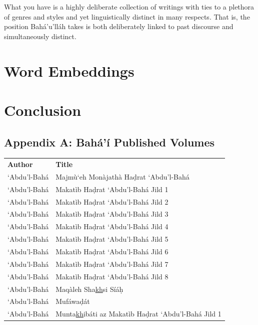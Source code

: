 \documentclass[12pt, oneside]{report}
\begin{document}
What you have is a highly deliberate collection of writings with ties to a plethora of genres and styles and yet linguistically distinct in many respects. That is, the position Bahá’u’lláh takes is both deliberately linked to past discourse and simultaneously	distinct.
		
	
\chapter{Word Embeddings}	
		
\chapter{Conclusion}
\newpage
\begin{appendix}
\chapter*{Appendix A: Bah\'{a}'\'{i} Published Volumes}
\label{app-1}
\begin{table}[ht]
	\setlength{\tabcolsep}{18pt}
	\begin{tabular}{ll}
	\textbf{Author} & \textbf{Title} \\
		`Abdu'l-Bah\'{a}	& Majm\`{u}`eh Mon\`{a}jath\`{a} Ha\d{d}rat `Abdu'l-Bah\'{a} \\
	`Abdu'l-Bah\'{a}	& Makat\`{i}b Ha\d{d}rat `Abdu'l-Bah\'{a} Jild 1 \\
	`Abdu'l-Bah\'{a}	& Makat\`{i}b Ha\d{d}rat `Abdu'l-Bah\'{a} Jild 2 \\
	`Abdu'l-Bah\'{a}	& Makat\`{i}b Ha\d{d}rat `Abdu'l-Bah\'{a} Jild 3 \\
	`Abdu'l-Bah\'{a}	& Makat\`{i}b Ha\d{d}rat `Abdu'l-Bah\'{a} Jild 4 \\
	`Abdu'l-Bah\'{a}	& Makat\`{i}b Ha\d{d}rat `Abdu'l-Bah\'{a} Jild 5 \\
	`Abdu'l-Bah\'{a}	& Makat\`{i}b Ha\d{d}rat `Abdu'l-Bah\'{a} Jild 6 \\
	`Abdu'l-Bah\'{a}	& Makat\`{i}b Ha\d{d}rat `Abdu'l-Bah\'{a} Jild 7 \\
	`Abdu'l-Bah\'{a}	& Makat\`{i}b Ha\d{d}rat `Abdu'l-Bah\'{a} Jild 8 \\
	`Abdu'l-Bah\'{a}	&  Maq\`{a}leh Sha\underline{kh}si S\'{i}\'{a}\d{h} \\
	`Abdu'l-Bah\'{a}	&  Muf\'{a}wa\d{d}\'{a}t \\
	`Abdu'l-Bah\'{a}	& Munta\underline{kh}ib\'{a}ti az Makat\`{i}b Ha\d{d}rat `Abdu'l-Bah\'{a} Jild 1 \\

\end{tabular}
\end{table}
\end{appendix}
\end{document}
